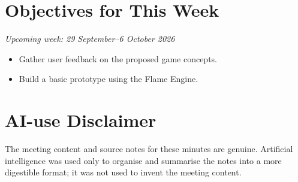 \documentclass[12pt,a4paper]{article}
\begin{document}
\section{Objectives for This Week}

\noindent\textit{Upcoming week: 29 September--6 October 2026}
\begin{itemize}[leftmargin=*]
    \item Gather user feedback on the proposed game concepts.
    \item Build a basic prototype using the Flame Engine.
\end{itemize}

\section*{\small AI-use Disclaimer}
\small The meeting content and source notes for these minutes are genuine. Artificial intelligence was used only to organise and summarise the notes into a more digestible format; it was not used to invent the meeting content.
\end{document}
